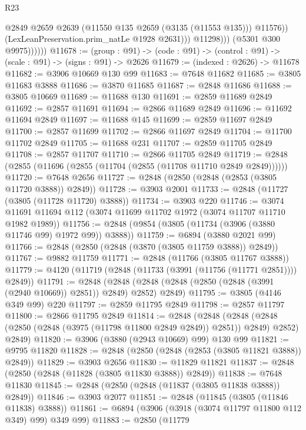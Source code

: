 \begin{lexlean}{R23}
\begin{coremodule}
                            @2849
                            @2659
                            @2639
                            (@11550 @135 @2659 (@3135 (@11553 @135)))
                            @11576))
                        (LexLeanPreservation.prim_natLe @1928 @2631)))
                    @11298)))
              (@5301 @300 @9975))))))
@11678 := (group : @91) ->
  (code : @91) -> (control : @91) -> (scale : @91) -> (signs : @91) -> @2626
@11679 := (indexed : @2626) -> @11678
@11682 := @3906 @10669 @130 @99
@11683 := @7648 @11682
@11685 := @3805 @11683 @3888
@11686 := @3870 @11685
@11687 := @2848 @11686
@11688 := @3805 @10669
@11689 := @11688 @130
@11691 := @2859 @11689 @2849
@11692 := @2857 @11691
@11694 := @2866 @11689 @2849
@11696 := @11692 @11694 @2849
@11697 := @11688 @145
@11699 := @2859 @11697 @2849
@11700 := @2857 @11699
@11702 := @2866 @11697 @2849
@11704 := @11700 @11702 @2849
@11705 := @11688 @231
@11707 := @2859 @11705 @2849
@11708 := @2857 @11707
@11710 := @2866 @11705 @2849
@11719 := @2848 (@2855 (@11696 (@2855 (@11704 (@2855 (@11708 @11710 @2849 @2849))))))
@11720 := @7648 @2656
@11727 := @2848 (@2850 (@2848 (@2853 (@3805 @11720 @3888)) @2849))
@11728 := @3903 @2001
@11733 := @2848 (@11727 (@3805 (@11728 @11720) @3888))
@11734 := @3903 @220
@11746 := @3074 @11691 @11694 @112 (@3074 @11699 @11702 @1972 (@3074 @11707 @11710 @1982 @1989))
@11756 := @2848 (@9854 (@3805 (@11734 (@3906 (@3880 @11746 @99) @1972 @99)) @3888))
@11759 := @6894 (@3880 @2021 @99)
@11766 := @2848 (@2850 (@2848 (@3870 (@3805 @11759 @3888)) @2849))
@11767 := @9882 @11759
@11771 := @2848 (@11766 (@3805 @11767 @3888))
@11779 := @4120 (@11719 (@2848 (@11733 (@3991 (@11756 (@11771 @2851)))) @2849))
@11791 := @2848
    (@2848 (@2848 (@2848 (@2850 (@2848 (@3991 (@2940 @10669)) @2851)) @2849) @2852) @2849)
@11795 := @3805 (@4146 @349 @99) @220
@11797 := @2859 @11795 @2849
@11798 := @2857 @11797
@11800 := @2866 @11795 @2849
@11814 := @2848
    (@2848
      (@2848 (@2848 (@2850 (@2848 (@3975 (@11798 @11800 @2849 @2849)) @2851)) @2849) @2852)
      @2849)
@11820 := @3906 (@3880 (@2943 @10669) @99) @130 @99
@11821 := @9795 @11820
@11828 := @2848 (@2850 (@2848 (@2853 (@3805 @11821 @3888)) @2849))
@11829 := @3903 @2656
@11830 := @11829 @11821
@11837 := @2848 (@2850 (@2848 (@11828 (@3805 @11830 @3888)) @2849))
@11838 := @7648 @11830
@11845 := @2848 (@2850 (@2848 (@11837 (@3805 @11838 @3888)) @2849))
@11846 := @3903 @2077
@11851 := @2848 (@11845 (@3805 (@11846 @11838) @3888))
@11861 := @6894 (@3906 (@3918 (@3074 @11797 @11800 @112 @349) @99) @349 @99)
@11883 := @2850
    (@11779

\end{coremodule}
\end{lexlean}
